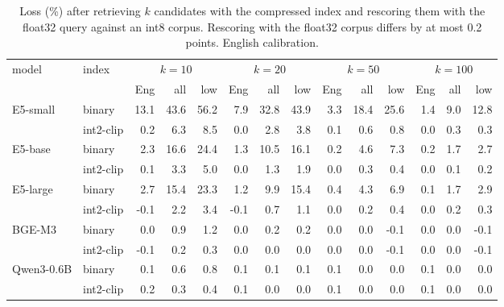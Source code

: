 \begin{table}[t]\centering\footnotesize
\begin{tabular}{llrrrrrrrrrrrr}
\toprule
model & index & \multicolumn{3}{c}{$k=10$} & \multicolumn{3}{c}{$k=20$} & \multicolumn{3}{c}{$k=50$} & \multicolumn{3}{c}{$k=100$} \\
 & & Eng & all & low & Eng & all & low & Eng & all & low & Eng & all & low \\
\midrule
E5-small & binary & 13.1 & 43.6 & 56.2 & 7.9 & 32.8 & 43.9 & 3.3 & 18.4 & 25.6 & 1.4 & 9.0 & 12.8 \\
 & int2-clip & 0.2 & 6.3 & 8.5 & 0.0 & 2.8 & 3.8 & 0.1 & 0.6 & 0.8 & 0.0 & 0.3 & 0.3 \\
E5-base & binary & 2.3 & 16.6 & 24.4 & 1.3 & 10.5 & 16.1 & 0.2 & 4.6 & 7.3 & 0.2 & 1.7 & 2.7 \\
 & int2-clip & 0.1 & 3.3 & 5.0 & 0.0 & 1.3 & 1.9 & 0.0 & 0.3 & 0.4 & 0.0 & 0.1 & 0.2 \\
E5-large & binary & 2.7 & 15.4 & 23.3 & 1.2 & 9.9 & 15.4 & 0.4 & 4.3 & 6.9 & 0.1 & 1.7 & 2.9 \\
 & int2-clip & -0.1 & 2.2 & 3.4 & -0.1 & 0.7 & 1.1 & 0.0 & 0.2 & 0.4 & 0.0 & 0.2 & 0.3 \\
BGE-M3 & binary & 0.0 & 0.9 & 1.2 & 0.0 & 0.2 & 0.2 & 0.0 & 0.0 & -0.1 & 0.0 & 0.0 & -0.1 \\
 & int2-clip & -0.1 & 0.2 & 0.3 & 0.0 & 0.0 & 0.0 & 0.0 & 0.0 & -0.1 & 0.0 & 0.0 & -0.1 \\
Qwen3-0.6B & binary & 0.1 & 0.6 & 0.8 & 0.1 & 0.1 & 0.1 & 0.1 & 0.0 & 0.0 & 0.1 & 0.0 & 0.0 \\
 & int2-clip & 0.2 & 0.3 & 0.4 & 0.1 & 0.0 & 0.0 & 0.1 & 0.0 & 0.0 & 0.1 & 0.0 & 0.0 \\
\bottomrule
\end{tabular}
\caption{Loss (\%) after retrieving $k$ candidates with the compressed index and rescoring them with the float32 query against an int8 corpus. Rescoring with the float32 corpus differs by at most 0.2 points. English calibration.}\label{tab:rescore}
\end{table}